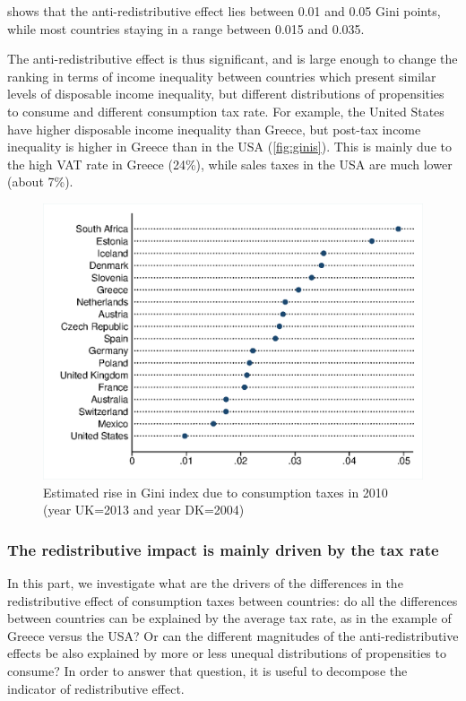 \documentclass[12pt]{article}
\begin{document}
 shows that the anti-redistributive effect lies between 0.01 and 0.05 Gini points, while most countries staying in a range between 0.015 and 0.035.

The anti-redistributive effect is thus significant, and is large enough to change the ranking in terms of income inequality between countries which present similar levels of disposable income inequality, but different distributions of propensities to consume and different consumption tax rate.  For example, the United States have higher disposable income inequality than Greece, but post-tax income inequality is higher in Greece than in the USA (\cref{fig:ginis}). This is mainly due to the high VAT rate in Greece (24\%), while sales taxes in the USA are much lower (about 7\%).


\begin{figure}
\centering
\includegraphics[height=0.42\textheight]{images/19-02_G_diff_ours_pred_mod2_2010}
\caption{Estimated rise in Gini index due to consumption taxes in 2010 \\ (year UK=2013 and year DK=2004)}
\label{fig:vatgini} 
\end{figure}


\subsubsection{The redistributive impact is mainly driven by the tax rate}
In this part, we investigate what are the drivers of the differences in the redistributive effect of consumption taxes between countries: do all the differences between countries can be explained by the average tax rate, as in the example of Greece versus the USA? Or can the different magnitudes of the anti-redistributive effects be also explained by more or less unequal distributions of propensities to consume? In order to answer that question, it is useful to decompose the indicator of redistributive effect.
\end{document}
